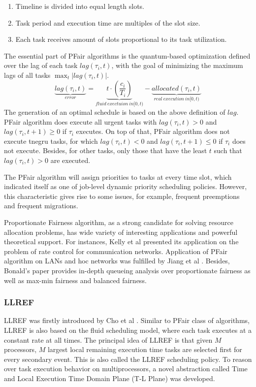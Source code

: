 \documentclass[preprint,12pt]{elsarticle}
\begin{document}
\begin{enumerate}
    \item Timeline is divided into equal length slots. 
    \item Task period and execution time are multiples of the slot size. 
    \item Each task receives amount of slots proportional to its task
        utilization. 
\end{enumerate}

The essential part of PFair algorithms is the quantum-based optimization
defined over the lag of each task $lag(\tau_i, t)$, with the goal of
minimizing the maximum lags of all tasks $\max_t|lag(\tau_i, t)|$.
\begin{equation}
    \underbrace{lag(\tau_i, t)}_{error} = 
    \underbrace{t \cdot (\frac{c_i}{T_i})}_{fluid\ exectuion\ in [0,t)} 
    - \underbrace{allocated(\tau_i, t)}_{real\ execution\ in [0,t)}
\end{equation}
The generation of an optimal schedule is based on the above definition of
$lag$. PFair algorithm does execute all urgent tasks with $lag(\tau_i, t) > 0$
and $lag(\tau_i, t +1) \geq 0$ if $\tau_i$ executes. 
On top of that, PFair algorithm does not execute tnegru tasks, for which
$lag(\tau_i, t) < 0$ and $lag(\tau_i, t+1) \leq 0$ if $\tau_i$ does not execute.  
Besides, for other tasks, only those that have the least $t$ such that
$lag(\tau_i,t) >0$ are executed.

The PFair algorithm will assign priorities to tasks at every time slot, which
indicated itself as one of job-level dynamic priority scheduling policies. 
However, this characteristic gives rise to some issues, for example, frequent
preemptions and frequent migrations.

Proportionate Fairness algorithm, as a strong candidate for solving
resource allocation problems, has wide variety of interesting applications and
powerful theoretical support. 
For instances, Kelly et al \cite{kelly1998rate} presented its application on
the problem of rate control for communication networks.  
Application of PFair algorithm on LANs and hoc networks was fulfilled by Jiang
et al \cite{jiang2005proportional}. Besides, Bonald's paper
\cite{bonald2006queueing} provides in-depth queueing analysis over proportionate
fairness as well as max-min fairness and balanced fairness. 

\subsubsection{LLREF}
LLREF was firstly introduced by Cho et al \cite{cho2006optimal}. Similar to
PFair class of algorithms, LLREF is also based on the fluid scheduling model,
where each task executes at a constant rate at all times.
The principal idea of LLREF is that given $M$ processors,  $M$ largest local
remaining execution time tasks are selected first for every secondary event. 
This is also called the LLREF scheduling policy.
To reason over task execution behavior on multiprocessors, a novel abstraction
 called Time and Local Execution Time Domain Plane (T-L Plane) was developed.
\end{document}
